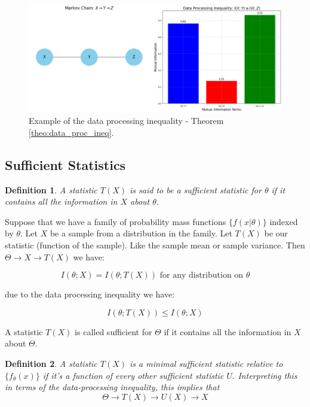\documentclass[a4paper,10pt]{article}
\newtheorem{definition}{Definition}[section] %
\newcommand{\hlt}[1]{\colorbox{color3}{#1}}
\begin{document}
\begin{figure}[ht]
    \centering
    \includegraphics[width=0.7\linewidth]{Figures/dara_process_inequality.png}
    \caption{Example of the data processing inequality - Theorem \ref{theo:data_proc_ineq}.}
    \label{fig:data_process_inequality}
\end{figure}

\subsection{Sufficient Statistics}

\begin{definition}
    A statistic $T(X)$ is said to be a \hlt{sufficient statistic} for $\theta$ if it contains all the information in $X$ about $\theta$.
\end{definition}


Suppose that we have a family of probability mass functions $\{f(x|\theta)\}$ indexed by $\theta$. Let $X$ be a sample from a distribution in the family. Let $T(X)$ be our statistic (function of the sample). Like the sample mean or sample variance. Then \hlt{$\Theta \rightarrow X \rightarrow T(X)$} we have:

$$
I(\theta; X) = I(\theta; T(X)) \text{ for any distribution on } \theta
$$

\noindent due to the data processing inequality we have:

$$
I(\theta; T(X)) \leq I(\theta; X)
$$

A statistic $T(X)$ is called \hlt{sufficient} for $\Theta$ if it contains all the information in $X$ about $\Theta$.

\begin{definition}
    A statistic $T(X)$ is a \hlt{minimal sufficient statistic} relative to $\{ f_\theta(x) \}$ if it's a function of every other sufficient statistic $U$. Interpreting this in terms of the data-processing inequality, this implies that 
    $$
        \Theta \rightarrow T(X) \rightarrow U(X) \rightarrow X
    $$
\end{definition}
\end{document}
